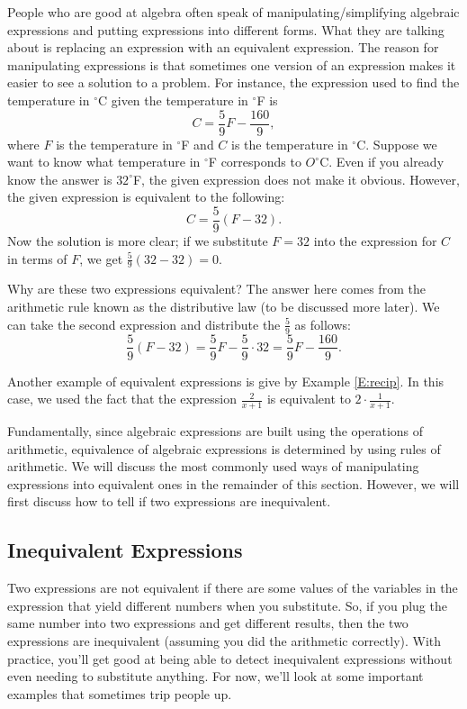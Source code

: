 People who are good at algebra often speak of manipulating/simplifying algebraic expressions and putting expressions into different forms. What they are talking about is replacing an expression with an equivalent expression. The reason for manipulating expressions is that sometimes one version of an expression makes it easier to see a solution to a problem. For instance, the expression used to find the temperature in $^{\circ}$C given the temperature in $^{\circ}$F is
\[
C = \frac{5}{9}F - \frac{160}{9},
\]
where $F$ is the temperature in $^{\circ}$F and $C$ is the temperature in $^{\circ}$C. Suppose we want to know what temperature in $^{\circ}$F corresponds to $O^{\circ}$C. Even if you already know the answer is $32^{\circ}$F, the given expression does not make it obvious. However, the given expression is equivalent to the following:
\[
C = \frac{5}{9}(F - 32).
\]
Now the solution is more clear; if we substitute $F=32$ into the expression for $C$ in terms of $F$, we get $\frac{5}{9}(32-32) = 0$. 
\par
Why are these two expressions equivalent? The answer here comes from the arithmetic rule known as the distributive law (to be discussed more later). We can take the second expression and distribute the $\frac{5}{9}$ as follows:
\[
\frac{5}{9}(F-32)  = \frac{5}{9}F - \frac{5}{9}\cdot 32 = \frac{5}{9}F-\frac{160}{9}.
\]

Another example of equivalent expressions is give by Example \ref{E:recip}.    In this case, we used the fact that the expression $\frac{2}{x+1}$ is equivalent to $2 \cdot \frac{1}{x+1}$.  

Fundamentally, since algebraic expressions are built using the operations of arithmetic, equivalence of algebraic expressions is determined by using rules of arithmetic. We will discuss the most commonly used ways of manipulating expressions into equivalent ones in the remainder of this section. However, we will first discuss how to tell if two expressions are inequivalent.

\subsection{Inequivalent Expressions}

Two expressions are not equivalent if there are some values of the variables in the expression that yield different numbers when you substitute. So, if you plug the same number into two expressions and get different results, then the two expressions are inequivalent (assuming you did the arithmetic correctly). With practice, you'll get good at being able to detect inequivalent expressions without even needing to substitute anything. For now, we'll look at some important examples that sometimes trip people up.

